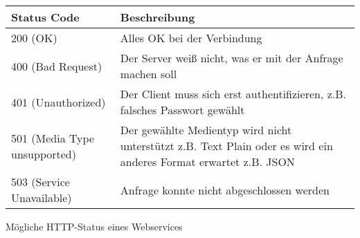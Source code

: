 \begin{tabular}{l | p{9.50 cm}}
	Status Code & Beschreibung \\
	\hline
	200 (OK) & Alles OK bei der Verbindung \\
	400 (Bad Request) & Der Server weiß nicht, was er mit der Anfrage machen soll \\
	401 (Unauthorized) & Der Client muss sich erst authentifizieren, z.B. falsches Passwort gewählt \\
	501 (Media Type unsupported) & Der gewählte Medientyp wird nicht unterstützt z.B. Text Plain oder es wird ein anderes Format erwartet z.B. JSON \\
	503 (Service Unavailable) & Anfrage konnte nicht abgeschlossen werden
\end{tabular}
\caption{Mögliche \acs{HTTP}-Status eines Webservices}
\label{tab:http_status}